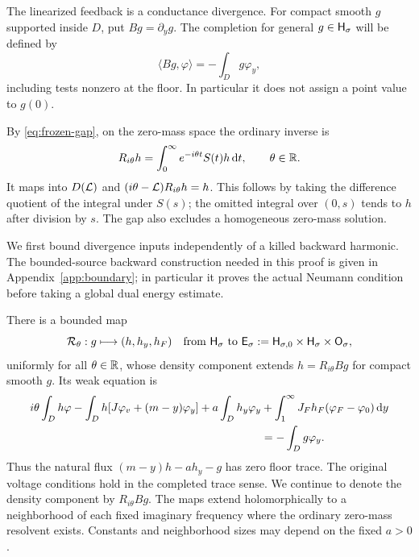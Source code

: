 The linearized feedback is a conductance divergence. For compact smooth
$g$ supported inside $D$, put $Bg=\partial_y g$. The completion for
general $g\in\mathsf H_\sigma$ will be defined by
\begin{equation}\label{eq:B-definition}
 \langle Bg,\varphi\rangle=-\int_Dg\varphi_y,
\end{equation}
including tests nonzero at the floor. In particular it does not assign
a point value to $g(0)$.

By \eqref{eq:frozen-gap}, on the zero-mass space the ordinary inverse is
\begin{equation}\label{eq:ordinary-resolvent}
 R_{i\theta}h=\int_0^\infty e^{-i\theta t}S(t)h\,\mathrm d t,
 \qquad \theta\in\mathbb R.
\end{equation}
It maps into $D(\mathcal L)$ and $(i\theta-\mathcal L)R_{i\theta}h=h$.
This follows by taking the difference quotient of the integral under
$S(s)$; the omitted integral over $(0,s)$ tends to $h$ after division by
$s$. The gap also excludes a homogeneous zero-mass solution.

We first bound divergence inputs independently of a killed backward
harmonic. The bounded-source backward construction needed in this proof
is given in Appendix~\ref{app:boundary}; in particular it proves the
actual Neumann condition before taking a global dual energy estimate.

\begin{proposition}\label{prop:divergence}
There is a bounded map
\[
 \mathcal R_\theta:g\longmapsto(h,h_y,h_F)
 \quad\hbox{from }\mathsf H_\sigma\hbox{ to }
 \mathsf E_\sigma:=\mathsf H_{\sigma,0}\times\mathsf H_\sigma\times\mathsf O_\sigma,
\]
uniformly for all $\theta\in\mathbb R$, whose density component extends
$h=R_{i\theta}Bg$ for compact smooth $g$. Its weak equation is
\begin{align}\label{eq:completed-resolvent}
 i\theta\int_Dh\varphi
 -\int_Dh[J\varphi_v+(m-y)\varphi_y]
 +a\int_Dh_y\varphi_y
 &+\int_1^\infty J_Fh_F(\varphi_F-\varphi_0)\,\mathrm d y\notag\\
 &=-\int_Dg\varphi_y.
\end{align}
Thus the natural flux $(m-y)h-ah_y-g$ has zero floor trace.
The original voltage conditions hold in the completed trace sense.
We continue to denote the density component by $R_{i\theta}Bg$.
The maps extend holomorphically to a neighborhood of each fixed
imaginary frequency where the ordinary zero-mass resolvent exists.
Constants and neighborhood sizes may depend on the fixed $a>0$.
\end{proposition}

